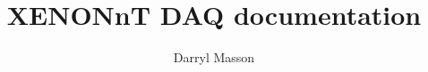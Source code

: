 \documentclass[a4paper, 12pt]{report}
\begin{document}
\title{XENONnT DAQ documentation}
\author{Darryl Masson}
\maketitle














\end{document}
